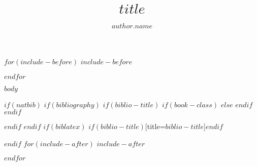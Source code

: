 \documentclass[fleqn,10pt]{wlpeerj} %
\title{$title$}
\author[$author.affiliation$]{$author.name$}
\affil[$affiliation.code$]{$affiliation.address$}
\begin{document}
$for(include-before)$
$include-before$

$endfor$


\flushbottom
\maketitle
\thispagestyle{empty}

$body$

$if(natbib)$
$if(bibliography)$
$if(biblio-title)$
$if(book-class)$
\renewcommand\bibname{$biblio-title$}
$else$
\renewcommand\refname{$biblio-title$}
$endif$
$endif$


$endif$
$endif$
$if(biblatex)$
\printbibliography$if(biblio-title)$[title=$biblio-title$]$endif$

$endif$
$for(include-after)$
$include-after$

$endfor$
\end{document}
